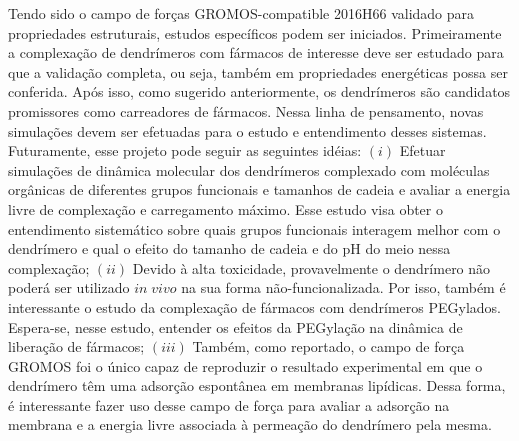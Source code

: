 Tendo sido o campo de forças GROMOS-compatible 2016H66\cite{Horta2016} validado para propriedades estruturais, estudos específicos podem ser iniciados.
Primeiramente a complexação de dendrímeros com fármacos de interesse deve ser estudado para que a validação completa, ou seja, também em propriedades energéticas possa ser conferida.
Após isso, como sugerido anteriormente, os dendrímeros são candidatos promissores como carreadores de fármacos.
Nessa linha de pensamento, novas simulações devem ser efetuadas para o estudo e entendimento desses sistemas.
Futuramente, esse projeto pode seguir as seguintes idéias:
$(i)$   Efetuar simulações de dinâmica molecular dos dendrímeros complexado com moléculas orgânicas de diferentes grupos funcionais e tamanhos de cadeia e avaliar a energia livre de complexação e carregamento máximo. Esse estudo visa obter o entendimento sistemático sobre quais grupos funcionais interagem melhor com o dendrímero e qual o efeito do tamanho de cadeia e do pH do meio nessa complexação;
$(ii)$  Devido à alta toxicidade, provavelmente o dendrímero não poderá ser utilizado $in \; vivo$ na sua forma não-funcionalizada. Por isso, também é interessante o estudo da complexação de fármacos com dendrímeros PEGylados. Espera-se, nesse estudo, entender os efeitos da PEGylação na dinâmica de liberação de fármacos;
$(iii)$ Também, como reportado, o campo de força GROMOS foi o único capaz de reproduzir o resultado experimental em que o dendrímero têm uma adsorção espontânea em membranas lipídicas. Dessa forma, é interessante fazer uso desse campo de força para avaliar a adsorção na membrana e a energia livre associada à permeação do dendrímero pela mesma.

\pagebreak
